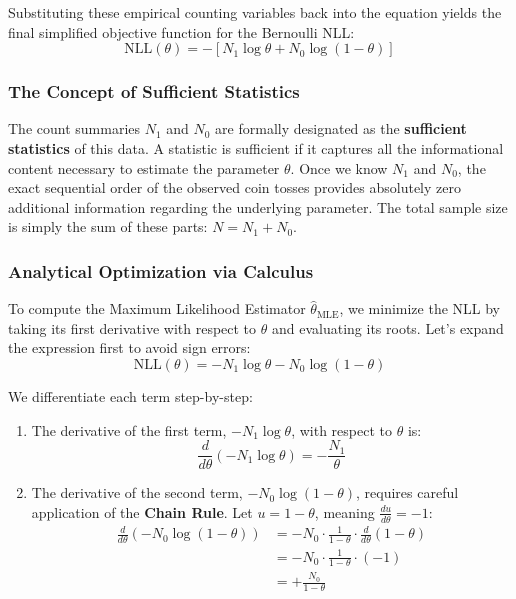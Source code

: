\documentclass{article}
\begin{document}
Substituting these empirical counting variables back into the equation yields the final simplified objective function for the Bernoulli NLL:
\begin{equation}
\text{NLL}(\theta) = - \left[ N_1 \log \theta + N_0 \log(1 - \theta) \right]
\end{equation}

\subsubsection{The Concept of Sufficient Statistics}
The count summaries $N_1$ and $N_0$ are formally designated as the \textbf{sufficient statistics} of this data. A statistic is sufficient if it captures all the informational content necessary to estimate the parameter $\theta$. Once we know $N_1$ and $N_0$, the exact sequential order of the observed coin tosses provides absolutely zero additional information regarding the underlying parameter. The total sample size is simply the sum of these parts: $N = N_1 + N_0$.

\subsubsection{Analytical Optimization via Calculus}

To compute the Maximum Likelihood Estimator $\hat{\theta}_{\text{MLE}}$, we minimize the NLL by taking its first derivative with respect to $\theta$ and evaluating its roots. Let's expand the expression first to avoid sign errors:
\begin{equation}
\text{NLL}(\theta) = -N_1 \log \theta - N_0 \log(1 - \theta)
\end{equation}

We differentiate each term step-by-step:
\begin{enumerate}
    \item The derivative of the first term, $-N_1 \log \theta$, with respect to $\theta$ is:
    \begin{equation}
    \frac{d}{d\theta}\left( -N_1 \log \theta \right) = -\frac{N_1}{\theta}
    \end{equation}
    
    \item The derivative of the second term, $-N_0 \log(1 - \theta)$, requires careful application of the \textbf{Chain Rule}. Let $u = 1 - \theta$, meaning $\frac{du}{d\theta} = -1$:
    \begin{align*}
    \frac{d}{d\theta}\left( -N_0 \log(1 - \theta) \right) &= -N_0 \cdot \frac{1}{1 - \theta} \cdot \frac{d}{d\theta}(1 - \theta) \\
    &= -N_0 \cdot \frac{1}{1 - \theta} \cdot (-1) \\
    &= + \frac{N_0}{1 - \theta}
    \end{align*}
\end{enumerate}
\end{document}
